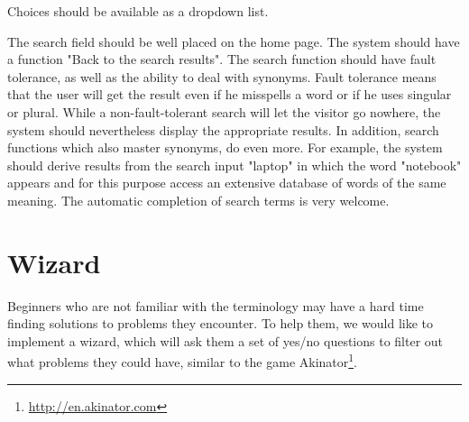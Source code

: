 Choices should be available as a dropdown list.
\bigskip

The search field should be well placed on the home page. 
The system should have a function "Back to the search results". 
The search function should have fault tolerance, as well as the ability to deal with synonyms. 
Fault tolerance means that the user will get the result even if he misspells a word or if he uses singular or plural. 
While a non-fault-tolerant search will let the visitor go nowhere, the system should nevertheless display the appropriate results.
In addition, search functions which also master synonyms, do even more. 
For example, the system should derive results from the search input "laptop" in which the word "notebook" appears and for this purpose access an extensive database of words of the same meaning. 
The automatic completion of search terms is very welcome.
  

\section{Wizard}
\label{wizard}
Beginners who are not familiar with the terminology may have a hard time finding solutions to problems they encounter. 
To help them, we would like to implement a wizard, which will ask them a set of yes/no questions to filter out what problems they could have, similar to the game Akinator\footnote{\url{http://en.akinator.com}}. 
 
